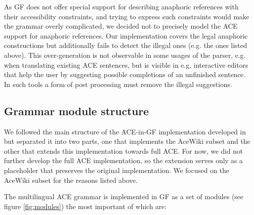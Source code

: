 \documentclass[a4paper]{article}
\begin{document}
As GF does not offer special support for describing anaphoric references
with their accessibility constraints, and trying to express such constraints
would make the grammar overly complicated,
we decided not to precisely model the ACE support for anaphoric references.
Our implementation covers the legal anaphoric constructions but additionally
fails to detect the illegal ones (e.g. the ones listed above). This
over-generation is not observable in some usages of the parser, e.g. when
translating existing ACE sentences, but is visible in e.g. interactive editors
that help the user by suggesting possible completions of an unfinished
sentence. In such tools a form of post processing must remove the illegal
suggestions.

\subsection{Grammar module structure}

We followed the main structure of the ACE-in-GF implementation developed
in \cite{ranta:cnl2009_revised} but separated it into two parts, one that
implements the AceWiki subset and the other that extends this implementation
towards full ACE. For now, we did not further develop the full ACE
implementation,
so the extension serves only as a placeholder that preserves the
original \cite{ranta:cnl2009_revised} implementation. We focused on the
AceWiki subset for the reasons listed above.

The multilingual ACE grammar is implemented in GF as a set of modules
(see figure \ref{fig:modules}) the most important of which are:
\end{document}

